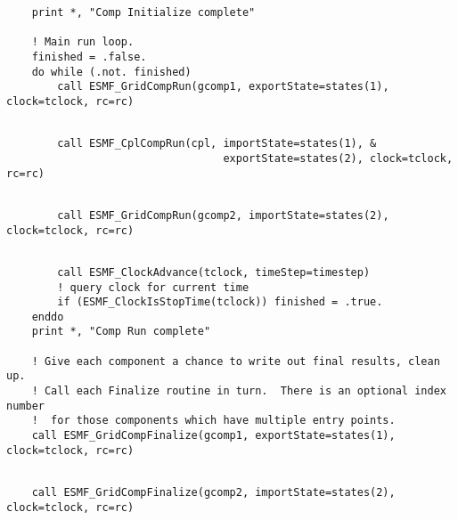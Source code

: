 
 \begin{verbatim}
    print *, "Comp Initialize complete"

    ! Main run loop.
    finished = .false.
    do while (.not. finished)
        call ESMF_GridCompRun(gcomp1, exportState=states(1), clock=tclock, rc=rc)
 
\end{verbatim}
 

 \begin{verbatim}
        call ESMF_CplCompRun(cpl, importState=states(1), &
                                  exportState=states(2), clock=tclock, rc=rc)
 
\end{verbatim}
 

 \begin{verbatim}
        call ESMF_GridCompRun(gcomp2, importState=states(2), clock=tclock, rc=rc)
 
\end{verbatim}
 

 \begin{verbatim}
        call ESMF_ClockAdvance(tclock, timeStep=timestep)
        ! query clock for current time
        if (ESMF_ClockIsStopTime(tclock)) finished = .true.
    enddo
    print *, "Comp Run complete"

    ! Give each component a chance to write out final results, clean up.
    ! Call each Finalize routine in turn.  There is an optional index number
    !  for those components which have multiple entry points.
    call ESMF_GridCompFinalize(gcomp1, exportState=states(1), clock=tclock, rc=rc)
 
\end{verbatim}
 

 \begin{verbatim}
    call ESMF_GridCompFinalize(gcomp2, importState=states(2), clock=tclock, rc=rc)
 
\end{verbatim}
 

